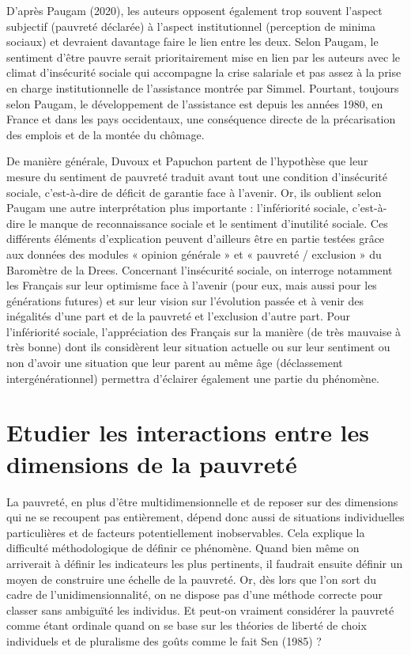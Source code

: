 \documentclass[12pt,a4paper]{reedthesis}
\begin{document}
D'après Paugam (2020), les auteurs opposent également trop souvent l'aspect subjectif (pauvreté déclarée) à l'aspect institutionnel (perception de minima sociaux) et devraient davantage faire le lien entre les deux. Selon Paugam, le sentiment d'être pauvre serait prioritairement mise en lien par les auteurs avec le climat d'insécurité sociale qui accompagne la crise salariale et pas assez à la prise en charge institutionnelle de l'assistance montrée par Simmel. Pourtant, toujours selon Paugam, le développement de l'assistance est depuis les années 1980, en France et dans les pays occidentaux, une conséquence directe de la précarisation des emplois et de la montée du chômage.

De manière générale, Duvoux et Papuchon partent de l'hypothèse que leur mesure du sentiment de pauvreté traduit avant tout une condition d'insécurité sociale, c'est-à-dire de déficit de garantie face à l'avenir. Or, ils oublient selon Paugam une autre interprétation plus importante : l'infériorité sociale, c'est-à-dire le manque de reconnaissance sociale et le sentiment d'inutilité sociale. Ces différents éléments d'explication peuvent d'ailleurs être en partie testées grâce aux données des modules « opinion générale » et « pauvreté / exclusion » du Baromètre de la Drees. Concernant l'insécurité sociale, on interroge notamment les Français sur leur optimisme face à l'avenir (pour eux, mais aussi pour les générations futures) et sur leur vision sur l'évolution passée et à venir des inégalités d'une part et de la pauvreté et l'exclusion d'autre part. Pour l'infériorité sociale, l'appréciation des Français sur la manière (de très mauvaise à très bonne) dont ils considèrent leur situation actuelle ou sur leur sentiment ou non d'avoir une situation que leur parent au même âge (déclassement intergénérationnel) permettra d'éclairer également une partie du phénomène.

\hypertarget{sec:objmem}{%
\section{Etudier les interactions entre les dimensions de la pauvreté}\label{sec:objmem}}

La pauvreté, en plus d'être multidimensionnelle et de reposer sur des dimensions qui ne se recoupent pas entièrement, dépend donc aussi de situations individuelles particulières et de facteurs potentiellement inobservables. Cela explique la difficulté méthodologique de définir ce phénomène. Quand bien même on arriverait à définir les indicateurs les plus pertinents, il faudrait ensuite définir un moyen de construire une échelle de la pauvreté. Or, dès lors que l'on sort du cadre de l'unidimensionnalité, on ne dispose pas d'une méthode correcte pour classer sans ambiguïté les individus. Et peut-on vraiment considérer la pauvreté comme étant ordinale quand on se base sur les théories de liberté de choix individuels et de pluralisme des goûts comme le fait Sen (1985) ?
\end{document}
